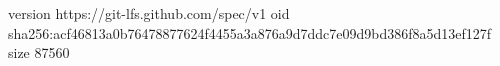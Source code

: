 version https://git-lfs.github.com/spec/v1
oid sha256:acf46813a0b76478877624f4455a3a876a9d7ddc7e09d9bd386f8a5d13ef127f
size 87560
